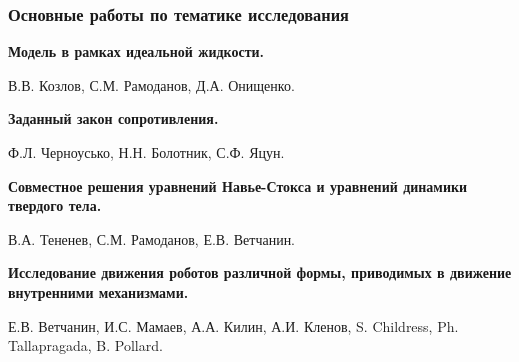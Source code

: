 \begin{frame}
\frametitle{Основные работы по тематике исследования}

\textbf{Модель в рамках идеальной жидкости.} %

В.В. Козлов, С.М. Рамоданов, Д.А. Онищенко.

\textbf{Заданный закон сопротивления.} 

Ф.Л. Черноусько, Н.Н. Болотник, С.Ф. Яцун.

\textbf{Совместное решения уравнений Навье-Стокса и уравнений динамики твердого тела.} 

В.А. Тененев, С.М. Рамоданов, Е.В. Ветчанин.


\textbf{Исследование движения роботов различной формы, приводимых в движение внутренними механизмами.} 

Е.В. Ветчанин, И.С. Мамаев, А.А. Килин, А.И. Кленов, S. Childress, Ph. Tallapragada, B. Pollard.


\vspace{3mm}

\begin{minipage}[t]{0.47\linewidth}
	 \\
\end{minipage}
\hfill	
\begin{minipage}[t]{0.47\linewidth}
\end{minipage}





\end{frame}

